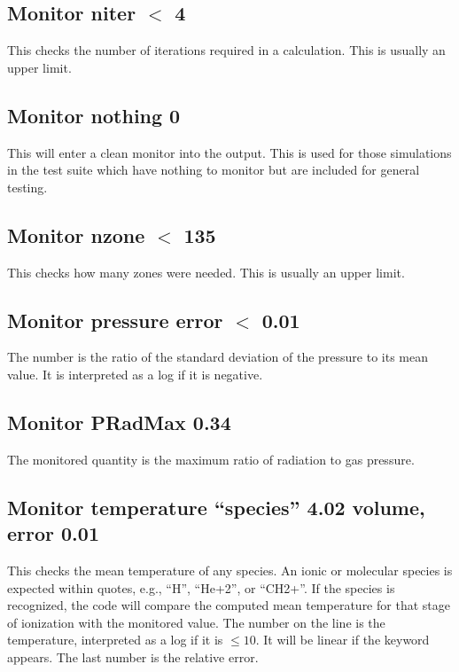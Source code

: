 \subsection{Monitor niter $<$ 4}

This checks the number of iterations required in a calculation.
This is usually an upper limit.

\subsection{Monitor nothing 0}

This will enter a clean monitor into the output.
This is used for those
simulations in the test suite which have nothing to
monitor but are included
for general testing.

\subsection{Monitor nzone $<$ 135}

This checks how many zones were needed.
This is usually an upper limit.

\subsection{Monitor pressure error $<$ 0.01}

The number is the ratio of the standard deviation of the pressure to
its mean value.
It is interpreted as a log if it is negative.

\subsection{Monitor PRadMax 0.34}

The monitored quantity is the maximum ratio of radiation to gas pressure.

\subsection{Monitor temperature ``species'' 4.02 volume, error 0.01}

This checks the mean temperature of any species.
An ionic or molecular species is expected within quotes,
e.g., ``H'', ``He+2'', or ``CH2+''.
If the species is recognized, the code will compare the computed mean
temperature for that stage of ionization with the monitored value.
The number on the line is the temperature, interpreted as a log if
it is $\le 10$.
It will be linear if the keyword  appears.
The last number is the relative error.

